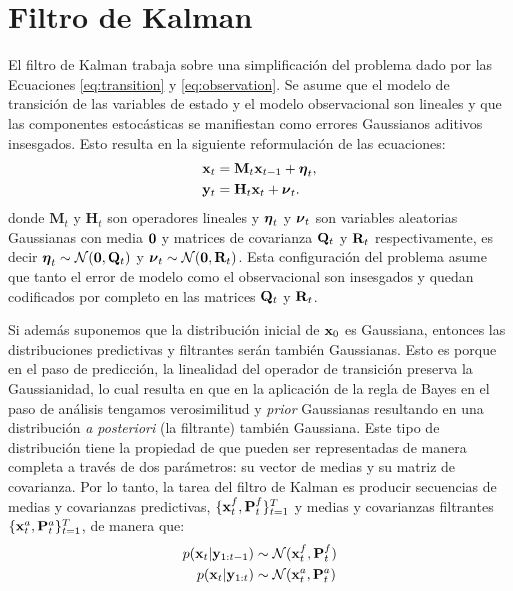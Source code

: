 \section{Filtro de Kalman}\label{sec:kf}

El filtro de Kalman trabaja sobre una simplificación del problema dado por las Ecuaciones \ref{eq:transition} y \ref{eq:observation}. Se asume que el modelo de transición de las variables de estado y el modelo observacional son lineales y que las componentes estocásticas se manifiestan como errores Gaussianos aditivos insesgados. Esto resulta en la siguiente reformulación de las ecuaciones:
\begin{align}
    \mathbf{x}_t &= \mathbf{M}_t \mathbf{x}_{t-1} + \mbox{\boldmath$ \eta $}_t, \label{eq:kf_forward}\\
    \mathbf{y}_t &= \mathbf{H}_t \mathbf{x}_t + \mbox{\boldmath$ \nu $}_t. \label{eq:kf_observational}
\end{align}
donde $\mathbf{M}_t$ y $\mathbf{H}_t$ son operadores lineales y $\mbox{\boldmath$ \eta $}_t$ y $\mbox{\boldmath$ \nu $}_t$ son variables aleatorias Gaussianas con media $\mathbf{0}$ y matrices de covarianza $\mathbf{Q}_t$ y $\mathbf{R}_t$ respectivamente, es decir $\mbox{\boldmath$ \eta $}_t \sim \mathcal{N}(\mathbf{0}, \mathbf{Q}_t)$ y $\mbox{\boldmath$ \nu $}_t \sim \mathcal{N}(\mathbf{0}, \mathbf{R}_t)$. Esta configuración del problema asume que tanto el error de modelo como el observacional son insesgados y quedan codificados por completo en las matrices $\mathbf{Q}_t$ y $\mathbf{R}_t$.

Si además suponemos que la distribución inicial de $\mathbf{x}_0$ es Gaussiana, entonces las distribuciones predictivas y filtrantes serán también Gaussianas. Esto es porque en el paso de predicción, la linealidad del operador de transición preserva la Gaussianidad, lo cual resulta en que en la aplicación de la regla de Bayes en el paso de análisis tengamos verosimilitud y \textit{prior} Gaussianas resultando en una distribución \textit{a posteriori} (la filtrante) también Gaussiana. Este tipo de distribución tiene la propiedad de que pueden ser representadas de manera completa a través de dos parámetros: su vector de medias y su matriz de covarianza. Por lo tanto, la tarea del filtro de Kalman es producir secuencias de medias y covarianzas predictivas, $\{\mathbf{x}_t^f, \mathbf{P}_t^f\}_{t=1}^{T}$ y medias y covarianzas filtrantes $\{\mathbf{x}_t^a, \mathbf{P}_t^a\}_{t=1}^{T}$, de manera que:
\begin{align*}
    p(\mathbf{x}_t | \mathbf{y}_{1:t-1}) &\sim \mathcal{N}(\mathbf{x}_t^f, \mathbf{P}_t^f) \\
    p(\mathbf{x}_t | \mathbf{y}_{1:t}) &\sim \mathcal{N}(\mathbf{x}_t^a, \mathbf{P}_t^a)
\end{align*}

